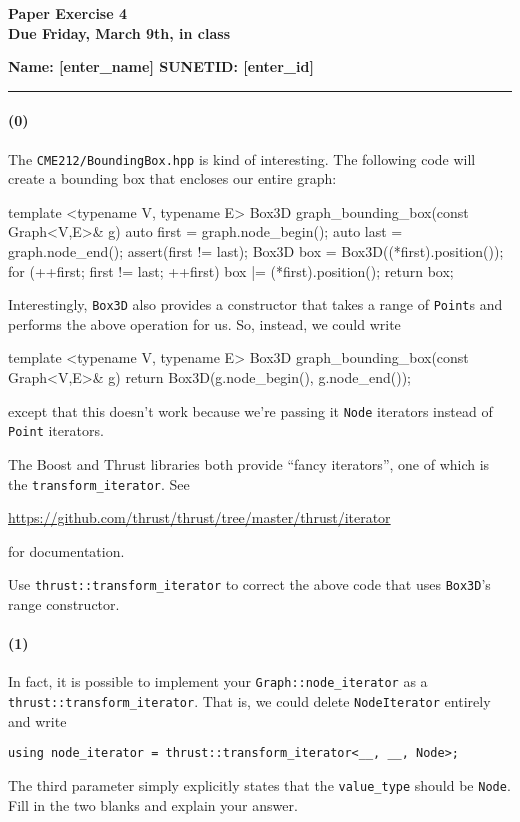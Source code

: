 \documentclass[12pt,letterpaper,twoside]{article}
\begin{document}
{\centering \textbf{Paper Exercise 4\\ Due Friday, March 9th, in class \\}}
{\centering \textbf{Name: [enter\_name] SUNETID: [enter\_id]} \par}
\vspace*{-8pt}\noindent\rule{\linewidth}{1pt}



\paragraph{(0)} The \texttt{CME212/BoundingBox.hpp} is kind of interesting. The following code will create a bounding box that encloses our entire graph:
\begin{cpp}
template <typename V, typename E>
Box3D graph_bounding_box(const Graph<V,E>& g) {
  auto first = graph.node_begin();
  auto last  = graph.node_end();
  assert(first != last);
  Box3D box = Box3D((*first).position());
  for (++first; first != last; ++first)
    box |= (*first).position();
  return box;
}
\end{cpp}
Interestingly, \texttt{Box3D} also provides a constructor that takes a range of \texttt{Point}s and performs the above operation for us. So, instead, we could write
\begin{cpp}
template <typename V, typename E>
Box3D graph_bounding_box(const Graph<V,E>& g) {
  return Box3D(g.node_begin(), g.node_end());
}
\end{cpp}
except that this doesn't work because we're passing it \texttt{Node} iterators instead of \texttt{Point} iterators.

The Boost and Thrust libraries both provide ``fancy iterators'', one of which is the \texttt{transform\_iterator}. See

\href{https://github.com/thrust/thrust/tree/master/thrust/iterator}{https://github.com/thrust/thrust/tree/master/thrust/iterator}

for documentation.

Use \texttt{thrust::transform\_iterator} to correct the above code that uses \texttt{Box3D}'s range constructor.

\paragraph{(1)} In fact, it is possible to implement your \texttt{Graph::node\_iterator} as a \texttt{thrust::transform\_iterator}. That is, we could delete \texttt{NodeIterator} entirely and write
\begin{verbatim}
using node_iterator = thrust::transform_iterator<__, __, Node>;
\end{verbatim}
The third parameter simply explicitly states that the \texttt{value\_type} should be \texttt{Node}. Fill in the two blanks and explain your answer.
\end{document}
